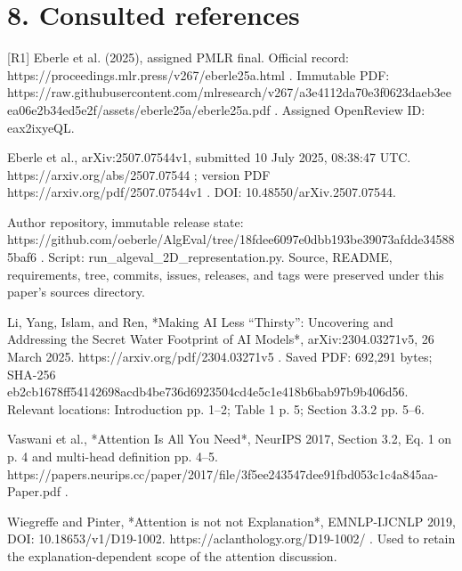 \documentclass[10pt]{article}
\begin{document}
\section*{8. Consulted references}
[R1] Eberle et al. (2025), assigned PMLR final. Official record: https://proceedings.mlr.press/v267/eberle25a.html . Immutable PDF: https://raw.githubusercontent.com/mlresearch/v267/a3e4112da70e3f0623daeb3eeea06e2b34ed5e2f/assets/eberle25a/eberle25a.pdf . Assigned OpenReview ID: eax2ixyeQL.\par
[R2] Eberle et al., arXiv:2507.07544v1, submitted 10 July 2025, 08:38:47 UTC. https://arxiv.org/abs/2507.07544 ; version PDF https://arxiv.org/pdf/2507.07544v1 . DOI: 10.48550/arXiv.2507.07544.\par
[R3] Author repository, immutable release state: https://github.com/oeberle/AlgEval/tree/18fdee6097e0dbb193be39073afdde345885baf6 . Script: run\_algeval\_2D\_representation.py. Source, README, requirements, tree, commits, issues, releases, and tags were preserved under this paper’s sources directory.\par
[R4] Li, Yang, Islam, and Ren, *Making AI Less “Thirsty”: Uncovering and Addressing the Secret Water Footprint of AI Models*, arXiv:2304.03271v5, 26 March 2025. https://arxiv.org/pdf/2304.03271v5 . Saved PDF: 692,291 bytes; SHA-256 eb2cb1678ff54142698acdb4be736d6923504cd4e5c1e418b6bab97b9b406d56. Relevant locations: Introduction pp. 1–2; Table 1 p. 5; Section 3.3.2 pp. 5–6.\par
[R5] Vaswani et al., *Attention Is All You Need*, NeurIPS 2017, Section 3.2, Eq. 1 on p. 4 and multi-head definition pp. 4–5. https://papers.neurips.cc/paper/2017/file/3f5ee243547dee91fbd053c1c4a845aa-Paper.pdf .\par
[R6] Wiegreffe and Pinter, *Attention is not not Explanation*, EMNLP-IJCNLP 2019, DOI: 10.18653/v1/D19-1002. https://aclanthology.org/D19-1002/ . Used to retain the explanation-dependent scope of the attention discussion.\par
\end{document}
